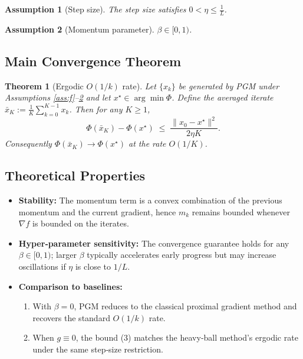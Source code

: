 \documentclass{article}
\newtheorem{theorem}{Theorem}
\newtheorem{assumption}{Assumption}
\begin{document}
\begin{assumption}[Step size]\label{ass:step}
The step size satisfies $0<\eta\le \frac{1}{L}$.
\end{assumption}

\begin{assumption}[Momentum parameter]\label{ass:beta}
$\beta\in[0,1)$.
\end{assumption}

\subsection*{Main Convergence Theorem}
\begin{theorem}[Ergodic $O(1/k)$ rate]\label{thm:main}
Let $\{x_{k}\}$ be generated by PGM under Assumptions \ref{ass:f}--\ref{ass:beta} and let $x^{\star}\in\arg\min\Phi$.  
Define the averaged iterate $\bar{x}_{K}:=\frac{1}{K}\sum_{k=0}^{K-1}x_{k}$.  
Then for any $K\ge1$,
\[
\Phi(\bar{x}_{K})-\Phi(x^{\star})
\;\le\;
\frac{\|x_{0}-x^{\star}\|^{2}}{2\eta K}.
\tag{3}
\]
Consequently $\Phi(\bar{x}_{K})\to\Phi(x^{\star})$ at the rate $O(1/K)$.
\end{theorem}

\subsection*{Theoretical Properties}
\begin{itemize}
  \item \textbf{Stability:} The momentum term is a convex combination of the previous momentum and the current gradient, hence $m_{k}$ remains bounded whenever $\nabla f$ is bounded on the iterates.
  \item \textbf{Hyper‑parameter sensitivity:} The convergence guarantee holds for any $\beta\in[0,1)$; larger $\beta$ typically accelerates early progress but may increase oscillations if $\eta$ is close to $1/L$.
  \item \textbf{Comparison to baselines:}
    \begin{enumerate}
      \item With $\beta=0$, PGM reduces to the classical proximal gradient method and recovers the standard $O(1/k)$ rate.
      \item When $g\equiv0$, the bound (3) matches the heavy‑ball method’s ergodic rate under the same step‑size restriction.
    \end{enumerate}
\end{itemize}
\end{document}
